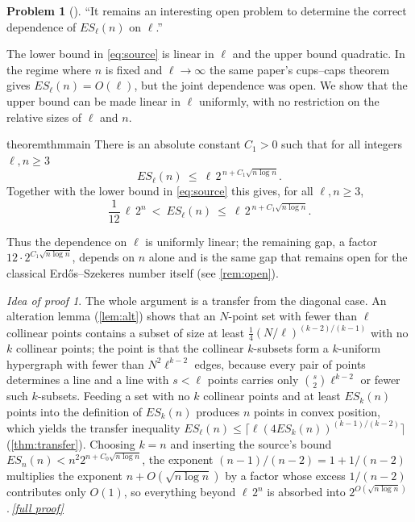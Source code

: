 \documentclass[11pt,a4paper]{article}
\theoremstyle{plain}
\theoremstyle{definition}
\newtheorem{problem}[theorem]{Problem}
\theoremstyle{remark}
\newtheorem*{proofidea}{Idea of proof}
\newcommand{\fullproofref}[1]{\,\hyperref[#1]{\textit{[full proof]}}}
\newcommand{\ES}{\mathit{ES}}
\begin{document}
\begin{problem}[{\cite{CFHMSV}}]\label{prob}
``It remains an interesting open problem to determine the correct dependence of $\ES_\ell(n)$ on $\ell$.''
\end{problem}

The lower bound in \eqref{eq:source} is linear in $\ell$ and the upper bound quadratic. In the regime where $n$ is fixed and $\ell\to\infty$ the same paper's cups--caps theorem gives $\ES_\ell(n)=O(\ell)$, but the joint dependence was open. We show that the upper bound can be made linear in $\ell$ uniformly, with no restriction on the relative sizes of $\ell$ and $n$.

\begin{restatable}{theorem}{thmmain}\label{thm:main}
There is an absolute constant $C_1>0$ such that for all integers $\ell,n\ge3$
\[
 \ES_\ell(n)\ \le\ \ell\,2^{\,n+C_1\sqrt{n\log n}}.
\]
Together with the lower bound in \eqref{eq:source} this gives, for all $\ell,n\ge3$,
\[
 \frac1{12}\,\ell\,2^{n}\ <\ \ES_\ell(n)\ \le\ \ell\,2^{\,n+C_1\sqrt{n\log n}}.
\]
\end{restatable}

Thus the dependence on $\ell$ is uniformly linear; the remaining gap, a factor $12\cdot 2^{C_1\sqrt{n\log n}}$, depends on $n$ alone and is the same gap that remains open for the classical Erdős--Szekeres number itself (see \cref{rem:open}).

\begin{proofidea}
The whole argument is a transfer from the diagonal case. An alteration lemma (\cref{lem:alt}) shows that an $N$-point set with fewer than $\ell$ collinear points contains a subset of size at least $\frac14(N/\ell)^{(k-2)/(k-1)}$ with no $k$ collinear points; the point is that the collinear $k$-subsets form a $k$-uniform hypergraph with fewer than $N^2\ell^{k-2}$ edges, because every pair of points determines a line and a line with $s<\ell$ points carries only $\binom s2\ell^{k-2}$ or fewer such $k$-subsets. Feeding a set with no $k$ collinear points and at least $\ES_k(n)$ points into the definition of $\ES_k(n)$ produces $n$ points in convex position, which yields the transfer inequality $\ES_\ell(n)\le\lceil\ell(4\ES_k(n))^{(k-1)/(k-2)}\rceil$ (\cref{thm:transfer}). Choosing $k=n$ and inserting the source's bound $\ES_n(n)<n^2 2^{n+C_0\sqrt{n\log n}}$, the exponent $(n-1)/(n-2)=1+1/(n-2)$ multiplies the exponent $n+O(\sqrt{n\log n})$ by a factor whose excess $1/(n-2)$ contributes only $O(1)$, so everything beyond $\ell\,2^n$ is absorbed into $2^{O(\sqrt{n\log n})}$.\fullproofref{pf:main}
\end{proofidea}
\end{document}
